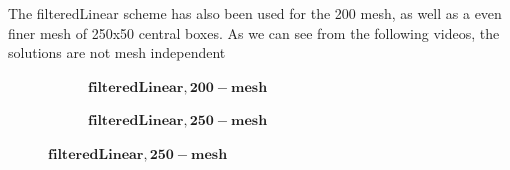\documentclass[a4paper,english,12pt,twoside]{article}
\begin{document}
The filteredLinear scheme has also been used for the 200 mesh, as well as a even finer mesh of 250x50 central boxes. As we can see from the following videos, the solutions are not mesh independent\\
\begin{figure}[h!]
	\begin{subfigure}{0.5\textwidth}
		\caption{$\mathbf{filteredLinear, 200-mesh}$}
 	\end{subfigure}
	\begin{subfigure}{0.5\textwidth}
		\caption{$\mathbf{filteredLinear, 250-mesh}$}
 	\end{subfigure}
\end{figure}
\end{document}
